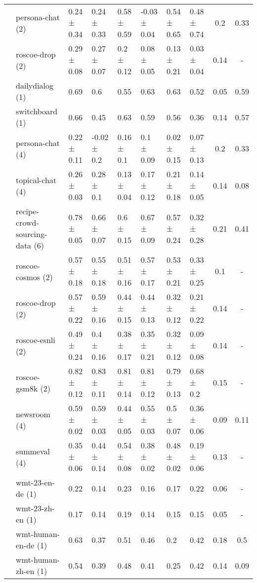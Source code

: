 \begin{tabular}{llllllll|cc}
 & \cellcolor{red!25}persona-chat (2) & 0.24 ± 0.34 & 0.24 ± 0.33 & 0.58 ± 0.59 & -0.03 ± 0.04 & 0.54 ± 0.65 & 0.48 ± 0.74 & 0.2 & 0.33 \\
 & \cellcolor{red!25}roscoe-drop (2) & 0.29 ± 0.08 & 0.27 ± 0.07 & 0.2 ± 0.12 & 0.08 ± 0.05 & 0.13 ± 0.21 & 0.03 ± 0.04 & 0.14 & - \\
 & \cellcolor{blue!25}dailydialog (1) & 0.69   & 0.6   & 0.55   & 0.63   & 0.63   & 0.52   & 0.05 & 0.59 \\
 & \cellcolor{blue!25}switchboard (1) & 0.66   & 0.45   & 0.63   & 0.59   & 0.56   & 0.36   & 0.14 & 0.57 \\
 & \cellcolor{red!25}persona-chat (4) & 0.22 ± 0.11 & -0.02 ± 0.2 & 0.16 ± 0.1 & 0.1 ± 0.09 & 0.02 ± 0.15 & 0.07 ± 0.13 & 0.2 & 0.33 \\
 & \cellcolor{red!25}topical-chat (4) & 0.26 ± 0.03 & 0.28 ± 0.1 & 0.13 ± 0.04 & 0.17 ± 0.12 & 0.21 ± 0.18 & 0.14 ± 0.05 & 0.14 & 0.08 \\
 & \cellcolor{red!25}recipe-crowd-sourcing-data (6) & 0.78 ± 0.05 & 0.66 ± 0.07 & 0.6 ± 0.15 & 0.67 ± 0.09 & 0.57 ± 0.24 & 0.32 ± 0.28 & 0.21 & 0.41 \\
 & \cellcolor{red!25}roscoe-cosmos (2) & 0.57 ± 0.18 & 0.55 ± 0.18 & 0.51 ± 0.16 & 0.57 ± 0.17 & 0.53 ± 0.21 & 0.33 ± 0.25 & 0.1 & - \\
 & \cellcolor{red!25}roscoe-drop (2) & 0.57 ± 0.22 & 0.59 ± 0.16 & 0.44 ± 0.15 & 0.44 ± 0.13 & 0.32 ± 0.12 & 0.21 ± 0.22 & 0.14 & - \\
 & \cellcolor{red!25}roscoe-esnli (2) & 0.49 ± 0.24 & 0.4 ± 0.16 & 0.38 ± 0.17 & 0.35 ± 0.21 & 0.32 ± 0.12 & 0.09 ± 0.08 & 0.14 & - \\
 & \cellcolor{red!25}roscoe-gsm8k (2) & 0.82 ± 0.12 & 0.83 ± 0.11 & 0.81 ± 0.14 & 0.81 ± 0.12 & 0.79 ± 0.13 & 0.68 ± 0.2 & 0.15 & - \\
 & \cellcolor{red!25}newsroom (4) & 0.59 ± 0.02 & 0.59 ± 0.03 & 0.44 ± 0.05 & 0.55 ± 0.03 & 0.5 ± 0.07 & 0.36 ± 0.06 & 0.09 & 0.11 \\
 & \cellcolor{red!25}summeval (4) & 0.35 ± 0.06 & 0.44 ± 0.14 & 0.54 ± 0.08 & 0.38 ± 0.02 & 0.48 ± 0.02 & 0.19 ± 0.06 & 0.13 & - \\
 & \cellcolor{red!25}wmt-23-en-de (1) & 0.22   & 0.14   & 0.23   & 0.16   & 0.17   & 0.22   & 0.06 & - \\
 & \cellcolor{red!25}wmt-23-zh-en (1) & 0.17   & 0.14   & 0.19   & 0.14   & 0.15   & 0.15   & 0.05 & - \\
 & \cellcolor{red!25}wmt-human-en-de (1) & 0.63   & 0.37   & 0.51   & 0.46   & 0.2   & 0.42   & 0.18 & 0.5 \\
 & \cellcolor{red!25}wmt-human-zh-en (1) & 0.54   & 0.39   & 0.48   & 0.41   & 0.25   & 0.42   & 0.14 & 0.09 \\
\bottomrule
\end{tabular}
